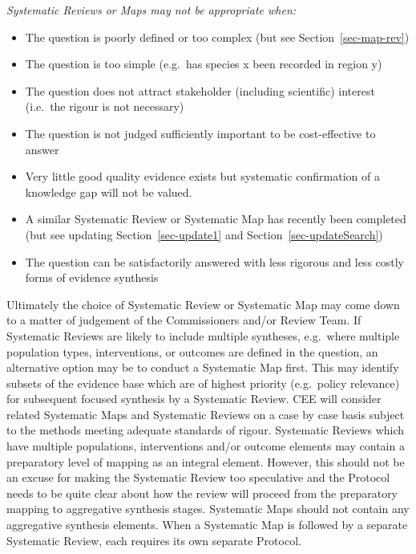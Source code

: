 \documentclass[
  letterpaper,
  DIV=11,
  numbers=noendperiod]{scrreprt}
\begin{document}
\emph{Systematic Reviews or Maps may not be appropriate when:}

\begin{itemize}
\item
  The question is poorly defined or too complex (but see
  Section~\ref{sec-map-rev})
\item
  The question is too simple (e.g.~has species x been recorded in region
  y)
\item
  The question does not attract stakeholder (including scientific)
  interest (i.e.~the rigour is not necessary)
\item
  The question is not judged sufficiently important to be cost-effective
  to answer
\item
  Very little good quality evidence exists but systematic confirmation
  of a knowledge gap will not be valued.
\item
  A similar Systematic Review or Systematic Map has recently been
  completed (but see updating Section~\ref{sec-update1} and
  Section~\ref{sec-updateSearch})
\item
  The question can be satisfactorily answered with less rigorous and
  less costly forms of evidence synthesis
\end{itemize}

Ultimately the choice of Systematic Review or Systematic Map may come
down to a matter of judgement of the Commissioners and/or Review Team.
If Systematic Reviews are likely to include multiple syntheses,
e.g.~where multiple population types, interventions, or outcomes are
defined in the question, an alternative option may be to conduct a
Systematic Map first. This may identify subsets of the evidence base
which are of highest priority (e.g.~policy relevance) for subsequent
focused synthesis by a Systematic Review. CEE will consider related
Systematic Maps and Systematic Reviews on a case by case basis subject
to the methods meeting adequate standards of rigour. Systematic Reviews
which have multiple populations, interventions and/or outcome elements
may contain a preparatory level of mapping as an integral element.
However, this should not be an excuse for making the Systematic Review
too speculative and the Protocol needs to be quite clear about how the
review will proceed from the preparatory mapping to aggregative
synthesis stages. Systematic Maps should not contain any aggregative
synthesis elements. When a Systematic Map is followed by a separate
Systematic Review, each requires its own separate Protocol.
\end{document}
